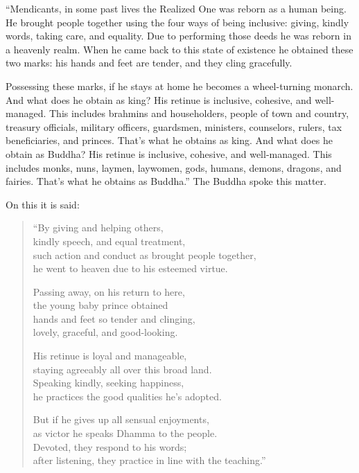 \documentclass[12pt,openany]{book}%
\begin{document}
“Mendicants, in some past lives the Realized One was reborn as a human being. He brought people together using the four ways of being inclusive: giving, kindly words, taking care, and equality. Due to performing those deeds he was reborn in a heavenly realm. When he came back to this state of existence he obtained these two marks: his hands and feet are tender, and they cling gracefully. 

Possessing these marks, if he stays at home he becomes a wheel-turning monarch. And what does he obtain as king? His retinue is inclusive, cohesive, and well-managed. This includes brahmins and householders, people of town and country, treasury officials, military officers, guardsmen, ministers, counselors, rulers, tax beneficiaries, and princes. That’s what he obtains as king. And what does he obtain as Buddha? His retinue is inclusive, cohesive, and well-managed. This includes monks, nuns, laymen, laywomen, gods, humans, demons, dragons, and fairies. That’s what he obtains as Buddha.” The Buddha spoke this matter. 

On this it is said: 

\begin{verse}%
“By giving and helping others, \\
kindly speech, and equal treatment, \\
such action and conduct as brought people together, \\
he went to heaven due to his esteemed virtue. 

Passing away, on his return to here, \\
the young baby prince obtained \\
hands and feet so tender and clinging, \\
lovely, graceful, and good-looking. 

His retinue is loyal and manageable, \\
staying agreeably all over this broad land. \\
Speaking kindly, seeking happiness, \\
he practices the good qualities he’s adopted. 

But if he gives up all sensual enjoyments, \\
as victor he speaks Dhamma to the people. \\
Devoted, they respond to his words; \\
after listening, they practice in line with the teaching.” 

%
\end{verse}
\end{document}
